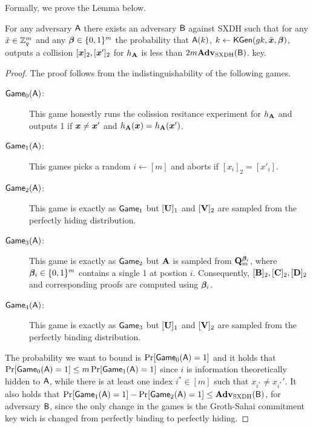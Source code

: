 Formally, we prove the Lemma below. 
\begin{lemma}
For any adversary $\mathsf{A}$ there exists an adversary $\mathsf{B}$ against SXDH such that for any $\tilde{x}\in\mathbb{Z}_q^m$ and any ${\boldsymbol{\beta}}\in\{0,1\}^m$  the probability that $\mathsf{A}(k)$, $k\gets\mathsf{KGen}(gk,\tilde{{\boldsymbol{x}}},{\boldsymbol{\beta}})$, outputs a collision $[{\boldsymbol{x}}]_2,[{\boldsymbol{x}}']_2$ for $h_{\mathbf{{A}}}$  is less than $2m \mathbf{Adv}_{\mathrm{SXDH}}(\mathsf{B})$. key.
\end{lemma}
\begin{proof}
The proof follows from the indistinguishability of the following games.
\begin{description}
\item[$\mathsf{Game}_0(\mathsf{A})$:] This game honestly runs the colission resitance experiment for $h_{\mathbf{{A}}}$ and outputs 1 if ${\boldsymbol{x}}\neq{\boldsymbol{x}}'$ and $h_{\mathbf{{A}}}({\boldsymbol{x}})=h_{\mathbf{{A}}}({\boldsymbol{x}}')$.
\item[$\mathsf{Game}_1(\mathsf{A})$:] This games picks a random $i\gets[m]$ and aborts if $[x_i]_2=[x'_i].$
\item[$\mathsf{Game}_2(\mathsf{A})$:] This game is exactly as $\mathsf{Game}_1$ but $[\mathbf{{U}}]_1$ and $[\mathbf{{V}}]_2$ are sampled from the perfectly hiding distribution.
\item[$\mathsf{Game}_3(\mathsf{A})$:] This game is exactly as $\mathsf{Game}_2$ but $\mathbf{{A}}$ is sampled from $\mathbf{{Q}}_m^{{\boldsymbol{\beta}}_i}$, where ${\boldsymbol{\beta}}_i\in\{0,1\}^m$ contains a single 1 at postion $i$. Consequently, $[\mathbf{{B}}]_2,[\mathbf{{C}}]_2,[\mathbf{{D}}]_2$ and corresponding proofs are computed using ${\boldsymbol{\beta}}_i$.
\item[$\mathsf{Game}_4(\mathsf{A})$:] This game is exactly as $\mathsf{Game}_3$ but $[\mathbf{{U}}]_1$ and $[\mathbf{{V}}]_2$ are sampled from the perfectly binding distribution.
\end{description}
The probability we want to bound is $\Pr[\mathsf{Game}_0(\mathsf{A})=1]$ and it holds that $\Pr[\mathsf{Game}_0(\mathsf{A})=1]\leq m\Pr[\mathsf{Game}_1(\mathsf{A})=1]$ since $i$ is information theoretically hidden to $\mathsf{A}$, while there is at least one index $i^*\in[m]$ such that $x_{i^*} \neq x_{i^*}'$. It also holds that $\Pr[\mathsf{Game}_1(\mathsf{A})=1]-\Pr[\mathsf{Game}_2(\mathsf{A})=1]\leq\mathbf{Adv}_\mathrm{SXDH}(\mathsf{B})$, for adversary $\mathsf{B}$, since the only change in the games is the Groth-Sahai commitment key wich is changed from perfectly binding to perfectly hiding.


\end{proof}
